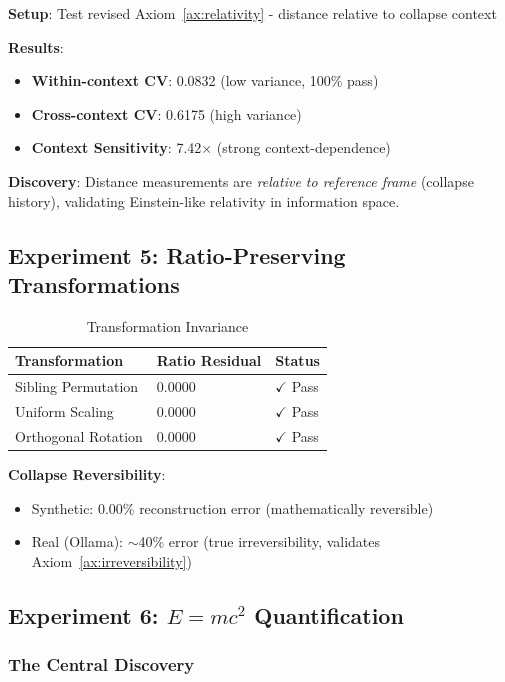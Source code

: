 \documentclass[11pt,a4paper]{article}
\begin{document}
\textbf{Setup}: Test revised Axiom~\ref{ax:relativity} - distance relative to collapse context

\textbf{Results}:
\begin{itemize}
    \item \textbf{Within-context CV}: 0.0832 (low variance, 100\% pass)
    \item \textbf{Cross-context CV}: 0.6175 (high variance)
    \item \textbf{Context Sensitivity}: 7.42$\times$ (strong context-dependence)
\end{itemize}

\textbf{Discovery}: Distance measurements are \emph{relative to reference frame} (collapse history), validating Einstein-like relativity in information space.

\subsection{Experiment 5: Ratio-Preserving Transformations}

\begin{table}[h]
\centering
\begin{tabular}{lll}
\toprule
\textbf{Transformation} & \textbf{Ratio Residual} & \textbf{Status} \\
\midrule
Sibling Permutation & 0.0000 & $\checkmark$ Pass \\
Uniform Scaling & 0.0000 & $\checkmark$ Pass \\
Orthogonal Rotation & 0.0000 & $\checkmark$ Pass \\
\bottomrule
\end{tabular}
\caption{Transformation Invariance}
\end{table}

\textbf{Collapse Reversibility}:
\begin{itemize}
    \item Synthetic: 0.00\% reconstruction error (mathematically reversible)
    \item Real (Ollama): $\sim$40\% error (true irreversibility, validates Axiom~\ref{ax:irreversibility})
\end{itemize}

\subsection{Experiment 6: $E=mc^2$ Quantification}

\subsubsection{The Central Discovery}
\end{document}
